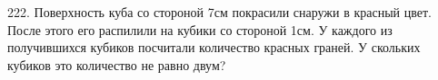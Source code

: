 222. Поверхность куба со стороной 7см покрасили снаружи в красный цвет. После этого его распилили на кубики со стороной 1см. У каждого из получившихся кубиков посчитали количество красных граней. У скольких кубиков это количество не равно двум?\\

